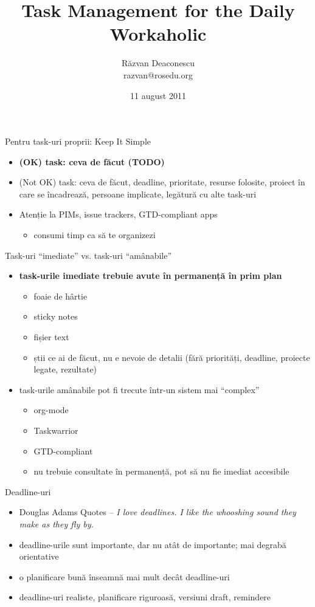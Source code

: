 \documentclass{simple}
\title[Task Management]{Task Management for the Daily Workaholic}
\institute{Întâlnirile lunare RLUG -- August 2011}
\author[Răzvan Deaconescu]{Răzvan Deaconescu \\
    razvan@rosedu.org}
\date{11 august 2011}
\begin{document}
\frame{\titlepage}

\begin{frame}{Pentru task-uri proprii: Keep It Simple}
  \begin{itemize}
    \item \textbf{(OK) task: ceva de făcut (TODO)}
    \item (Not OK) task: ceva de făcut, deadline, prioritate, resurse folosite,
    proiect în care se încadrează, persoane implicate, legătură cu alte task-uri
    \item Atenție la PIMs, issue trackers, GTD-compliant apps
      \begin{itemize}
        \item consumi timp ca să te organizezi
      \end{itemize}
  \end{itemize}
\end{frame}

\begin{frame}{Task-uri ``imediate'' vs. task-uri ``amânabile''}
  \begin{itemize}
    \item \textbf{task-urile imediate trebuie avute în permanență în prim plan}
      \begin{itemize}
        \item foaie de hârtie
        \item sticky notes
        \item fișier text
        \item știi ce ai de făcut, nu e nevoie de detalii (fără priorități,
        deadline, proiecte legate, rezultate)
      \end{itemize}
    \item task-urile amânabile pot fi trecute într-un sistem mai ``complex''
      \begin{itemize}
        \item org-mode
        \item Taskwarrior
        \item GTD-compliant
        \item nu trebuie consultate în permanență, pot să nu fie imediat
        accesibile
      \end{itemize}
  \end{itemize}
\end{frame}

\begin{frame}{Deadline-uri}
  \begin{itemize}
    \item Douglas Adams Quotes -- \textit{I love deadlines. I like the
    whooshing sound they make as they fly by.}
    \item deadline-urile sunt importante, dar nu atât de importante; mai
    degrabă orientative
    \item o planificare bună înseamnă mai mult decât deadline-uri
    \item deadline-uri realiste, planificare riguroasă, versiuni draft,
    remindere
  \end{itemize}
\end{frame}
\end{document}
